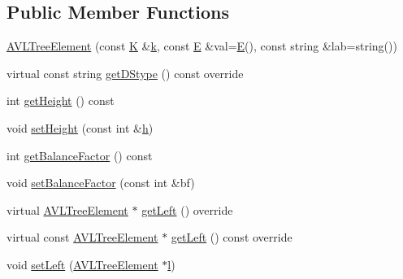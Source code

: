 \subsection*{Public Member Functions}
\begin{DoxyCompactItemize}
\item 
\mbox{\hyperlink{classbridges_1_1_a_v_l_tree_element_a24d1dfb65f00f2fef96a57a3f869a263}{A\+V\+L\+Tree\+Element}} (const \mbox{\hyperlink{namespacebridges_acfb0a4f7877d8f63de3e6862004c50edaa5f3c6a11b03839d46af9fb43c97c188}{K}} \&\mbox{\hyperlink{namespacebridges_acfb0a4f7877d8f63de3e6862004c50eda8ce4b16b22b58894aa86c421e8759df3}{k}}, const \mbox{\hyperlink{namespacebridges_acfb0a4f7877d8f63de3e6862004c50eda3a3ea00cfc35332cedf6e5e9a32e94da}{E}} \&val=\mbox{\hyperlink{namespacebridges_acfb0a4f7877d8f63de3e6862004c50eda3a3ea00cfc35332cedf6e5e9a32e94da}{E}}(), const string \&lab=string())
\item 
virtual const string \mbox{\hyperlink{classbridges_1_1_a_v_l_tree_element_a24c005f8e07a7a2682225cead3b7e364}{get\+D\+Stype}} () const override
\item 
int \mbox{\hyperlink{classbridges_1_1_a_v_l_tree_element_ace72b436fa14db4f7844cc6e30b87aa7}{get\+Height}} () const
\item 
void \mbox{\hyperlink{classbridges_1_1_a_v_l_tree_element_acbf2a222b954e5d9221b109634822f96}{set\+Height}} (const int \&\mbox{\hyperlink{namespacebridges_acfb0a4f7877d8f63de3e6862004c50eda2510c39011c5be704182423e3a695e91}{h}})
\item 
int \mbox{\hyperlink{classbridges_1_1_a_v_l_tree_element_aa37dc257fbc32ad8bfdd885bf98d3a8d}{get\+Balance\+Factor}} () const
\item 
void \mbox{\hyperlink{classbridges_1_1_a_v_l_tree_element_a076ec482874d248764348e62dd4652d2}{set\+Balance\+Factor}} (const int \&bf)
\item 
virtual \mbox{\hyperlink{classbridges_1_1_a_v_l_tree_element}{A\+V\+L\+Tree\+Element}} $\ast$ \mbox{\hyperlink{classbridges_1_1_a_v_l_tree_element_a7b5d05660da127f5f6164120d9846d90}{get\+Left}} () override
\item 
virtual const \mbox{\hyperlink{classbridges_1_1_a_v_l_tree_element}{A\+V\+L\+Tree\+Element}} $\ast$ \mbox{\hyperlink{classbridges_1_1_a_v_l_tree_element_a61e075db5414b7bd6f52d657401acda3}{get\+Left}} () const override
\item 
void \mbox{\hyperlink{classbridges_1_1_a_v_l_tree_element_a19980980e712d10a1158272ecc44ef10}{set\+Left}} (\mbox{\hyperlink{classbridges_1_1_a_v_l_tree_element}{A\+V\+L\+Tree\+Element}} $\ast$\mbox{\hyperlink{namespacebridges_acfb0a4f7877d8f63de3e6862004c50eda2db95e8e1a9267b7a1188556b2013b33}{l}})

\end{DoxyCompactItemize}

